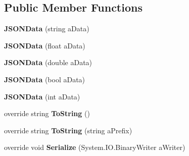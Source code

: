 \subsection*{Public Member Functions}
\begin{DoxyCompactItemize}
\item 
\mbox{\label{class_lunar_console_editor_internal_1_1_j_s_o_n_data_a4aba10dad75654c978a44dd25b745940}} 
{\bfseries J\+S\+O\+N\+Data} (string a\+Data)
\item 
\mbox{\label{class_lunar_console_editor_internal_1_1_j_s_o_n_data_a43bac35664bf53711d23dc95f44ec6e8}} 
{\bfseries J\+S\+O\+N\+Data} (float a\+Data)
\item 
\mbox{\label{class_lunar_console_editor_internal_1_1_j_s_o_n_data_adb42f0870c5fba734badae2f99795c47}} 
{\bfseries J\+S\+O\+N\+Data} (double a\+Data)
\item 
\mbox{\label{class_lunar_console_editor_internal_1_1_j_s_o_n_data_ac0c39a6a63890df56e39804d91adaabb}} 
{\bfseries J\+S\+O\+N\+Data} (bool a\+Data)
\item 
\mbox{\label{class_lunar_console_editor_internal_1_1_j_s_o_n_data_afafbb276a1b4e55e4d7aee2e8a82d4c9}} 
{\bfseries J\+S\+O\+N\+Data} (int a\+Data)
\item 
\mbox{\label{class_lunar_console_editor_internal_1_1_j_s_o_n_data_adcb89591c94b305a37952af1b65b91d0}} 
override string {\bfseries To\+String} ()
\item 
\mbox{\label{class_lunar_console_editor_internal_1_1_j_s_o_n_data_a80a44a07ad779fc391ff2f45f6666172}} 
override string {\bfseries To\+String} (string a\+Prefix)
\item 
\mbox{\label{class_lunar_console_editor_internal_1_1_j_s_o_n_data_a7a96da260179c0c99c0fefbda6d201bc}} 
override void {\bfseries Serialize} (System.\+I\+O.\+Binary\+Writer a\+Writer)
\end{DoxyCompactItemize}
